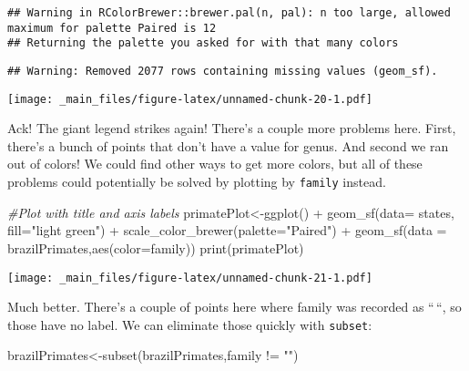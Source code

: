 \documentclass[
]{book}
\newenvironment{Shaded}{\begin{snugshade}}{\end{snugshade}}
\newcommand{\AttributeTok}[1]{\textcolor[rgb]{0.77,0.63,0.00}{#1}}
\newcommand{\CommentTok}[1]{\textcolor[rgb]{0.56,0.35,0.01}{\textit{#1}}}
\newcommand{\FunctionTok}[1]{\textcolor[rgb]{0.00,0.00,0.00}{#1}}
\newcommand{\NormalTok}[1]{#1}
\newcommand{\OtherTok}[1]{\textcolor[rgb]{0.56,0.35,0.01}{#1}}
\newcommand{\SpecialCharTok}[1]{\textcolor[rgb]{0.00,0.00,0.00}{#1}}
\newcommand{\StringTok}[1]{\textcolor[rgb]{0.31,0.60,0.02}{#1}}
\begin{document}
\begin{verbatim}
## Warning in RColorBrewer::brewer.pal(n, pal): n too large, allowed maximum for palette Paired is 12
## Returning the palette you asked for with that many colors
\end{verbatim}

\begin{verbatim}
## Warning: Removed 2077 rows containing missing values (geom_sf).
\end{verbatim}

\texttt{[image: \_main\_files/figure-latex/unnamed-chunk-20-1.pdf]}

Ack! The giant legend strikes again! There's a couple more problems here. First, there's a bunch of points that don't have a value for genus. And second we ran out of colors! We could find other ways to get more colors, but all of these problems could potentially be solved by plotting by \texttt{family} instead.

\begin{Shaded}
\begin{Highlighting}[]
\CommentTok{\#Plot with title and axis labels}
\NormalTok{primatePlot}\OtherTok{\textless{}{-}}\FunctionTok{ggplot}\NormalTok{() }\SpecialCharTok{+} 
  \FunctionTok{geom\_sf}\NormalTok{(}\AttributeTok{data=}\NormalTok{ states, }\AttributeTok{fill=}\StringTok{"light green"}\NormalTok{) }\SpecialCharTok{+}
  \FunctionTok{scale\_color\_brewer}\NormalTok{(}\AttributeTok{palette=}\StringTok{"Paired"}\NormalTok{) }\SpecialCharTok{+}
  \FunctionTok{geom\_sf}\NormalTok{(}\AttributeTok{data =}\NormalTok{ brazilPrimates,}\FunctionTok{aes}\NormalTok{(}\AttributeTok{color=}\NormalTok{family))}
\FunctionTok{print}\NormalTok{(primatePlot)}
\end{Highlighting}
\end{Shaded}

\texttt{[image: \_main\_files/figure-latex/unnamed-chunk-21-1.pdf]}

Much better. There's a couple of points here where family was recorded as ``\,``, so those have no label. We can eliminate those quickly with \texttt{subset}:

\begin{Shaded}
\begin{Highlighting}[]
\NormalTok{brazilPrimates}\OtherTok{\textless{}{-}}\FunctionTok{subset}\NormalTok{(brazilPrimates,family }\SpecialCharTok{!=} \StringTok{""}\NormalTok{)}
\end{Highlighting}
\end{Shaded}
\end{document}

